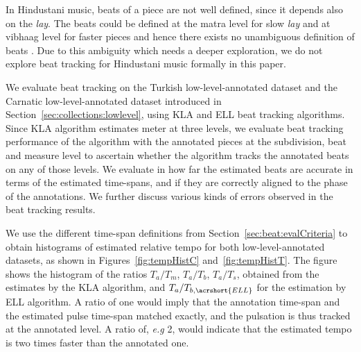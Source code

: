 
In Hindustani music, beats of a piece are not well defined, since it depends also on the \textit{lay}. The beats could be defined at the \gls{matra} level for slow \textit{lay} and at \gls{vibhaag} level for faster pieces and hence there exists no unambiguous definition of beats \cite[p.~91]{clayton:00:time}. Due to this ambiguity which needs a deeper exploration, we do not explore beat tracking for Hindustani music formally in this paper.

We evaluate beat tracking on the Turkish low-level-annotated dataset and the Carnatic low-level-annotated dataset introduced in Section~\ref{sec:collections:lowlevel}, using \acrshort{KLA} and \acrshort{ELL} beat tracking algorithms. Since \acrshort{KLA} algorithm estimates meter at three levels, we evaluate beat tracking performance of the algorithm with the annotated pieces at the subdivision, beat and measure level to ascertain whether the algorithm tracks the annotated beats on any of those levels. We evaluate in how far the estimated beats are accurate in terms of the estimated time-spans, and if they are correctly aligned to the phase of the annotations. We further discuss various kinds of errors observed in the beat tracking results. 

We use the different time-span definitions from Section~\ref{sec:beat:evalCriteria} to obtain histograms of estimated relative tempo for both low-level-annotated datasets, as shown in Figures~\ref{fig:tempHistC} and~\ref{fig:tempHistT}. The figure shows the histogram of the ratios $T_a/T_m$, $T_a/T_b$, $T_a/T_s$, obtained from the estimates by the \acrshort{KLA} algorithm, and $T_a/T_{b,\acrshort{ELL}}$ for the estimation by \acrshort{ELL} algorithm. A ratio of one would imply that the annotation time-span and the estimated pulse time-span matched exactly, and the pulsation is thus tracked at the annotated level. A ratio of, \textit{e.g} 2, would indicate that the estimated tempo is two times faster than the annotated one. 


